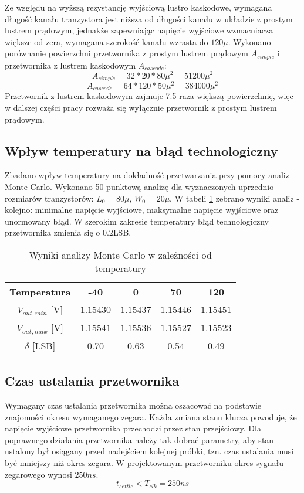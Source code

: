 \documentclass[10pt,a4paper,twoside]{report}
\theoremstyle{definition}
\theoremstyle{definition}
\theoremstyle{definition}
\theoremstyle{definition}
\theoremstyle{definition}
\begin{document}
{{{{{	Ze względu na wyższą rezystancję wyjściową lustro kaskodowe, wymagana długość kanału tranzystora jest niższa od długości kanału w układzie z prostym lustrem prądowym, jednakże zapewniając napięcie wyjściowe wzmacniacza większe od zera, wymagana szerokość kanału wzrasta do $120\mu$. Wykonano porównanie powierzchni przetwornika z prostym lustrem prądowym $A_{simple}$ i przetwornika z lustrem kaskodowym $A_{cascode}$:
	\begin{equation}
		A_{simple}  = 32*20*80 \mu^2 = 51 200  \mu^2 
	\end{equation}
	\begin{equation}
		A_{cascode}  = 64*120*50 \mu^2 = 384 000 \mu^2
	\end{equation}
	Przetwornik z lustrem kaskodowym zajmuje 7.5 raza większą powierzchnię, więc w dalszej części pracy rozważa się wyłącznie przetwornik z prostym lustrem prądowym.
	
	\subsection{Wpływ temperatury na błąd technologiczny}
	{	Zbadano wpływ temperatury na dokładność przetwarzania przy pomocy analiz Monte Carlo. Wykonano 50-punktową analizę dla wyznaczonych uprzednio rozmiarów tranzystorów: $L_0 = 80\mu$, $W_0 = 20\mu$. W tabeli \ref{tab:mc_temp} zebrano wyniki analiz - kolejno: minimalne napięcie wyjściowe, maksymalne napięcie wyjściowe oraz unormowany błąd.	W szerokim zakresie temperatury błąd technologiczny przetwornika zmienia się o $0.2$LSB. }
	\begin{table}[!ht]
	\begin{center}
		\begin{tabular}{|c|c|c|c|c|}
			\hline 
			Temperatura & -40 & 0 & 70  & 120\\ 
			\hline 
			$V_{out,min}$ [V] & $1.15430$ & $1.15437$ & $1.15446$ & $1.15451$ \\ 
			\hline
			$V_{out,max}$ [V] & $1.15541$ & $1.15536$ & $1.15527$ & $1.15523$\\ 
			\hline 
			$\delta$ [LSB]  & 0.70 & 0.63 & 0.54 & 0.49\\
			\hline
		\end{tabular}
	\end{center}
	\caption{Wyniki analizy Monte Carlo w zależności od temperatury}
	\label{tab:mc_temp}
	\end{table}

	\subsection{Czas ustalania przetwornika}
	{	Wymagany czas ustalania przetwornika można oszacować na podstawie znajomości okresu wymaganego zegara. Każda zmiana stanu klucza powoduje, że napięcie wyjściowe przetwornika przechodzi przez stan przejściowy. Dla poprawnego działania przetwornika należy tak dobrać parametry, aby stan ustalony był osiągany przed nadejściem kolejnej próbki, tzn. czas ustalania musi być mniejszy niż okres zegara. W projektowanym przetworniku okres sygnału zegarowego wynosi $250ns$.
		\begin{equation}
		t_{settle} < T_{clk} = 250ns
		\end{equation}

}}}}}}
\end{document}
